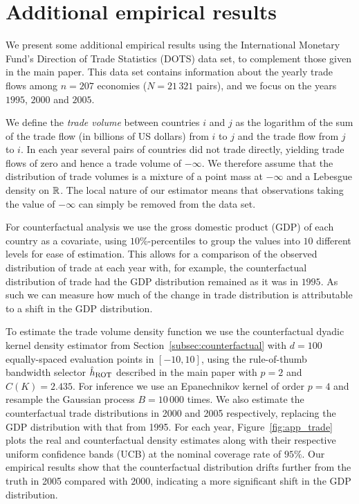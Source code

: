 \section{Additional empirical results}%

We present some additional empirical results
using the International Monetary Fund's
Direction of Trade Statistics (DOTS) data set,
to complement those given in the main paper.
This data set contains information about
the yearly trade flows among
$n = 207$ economies ($N = 21\,321$ pairs),
and we focus on the years
$1995$, $2000$ and $2005$.

We define the \emph{trade volume} between countries
$i$ and $j$ as the logarithm of the sum of
the trade flow (in billions of US dollars)
from $i$ to $j$ and the trade flow from $j$ to $i$.
In each year several pairs of countries
did not trade directly, yielding trade flows of zero
and hence a trade volume of $-\infty$.
We therefore assume that the distribution of trade volumes
is a mixture of a point mass at $-\infty$ and a
Lebesgue density on $\mathbb{R}$.
The local nature of our estimator means that
observations taking the value of $-\infty$
can simply be removed from the data set.

For counterfactual analysis we use the
gross domestic product (GDP) of each country as a
covariate, using $10\%$-percentiles to group the values into
$10$ different levels for ease of estimation.
This allows for a comparison of the observed distribution of trade at each year
with, for example, the counterfactual distribution of trade
had the GDP distribution remained as it was in $1995$.
As such we can measure how much of the change in trade
distribution is attributable
to a shift in the GDP distribution.

To estimate the trade volume density function
we use the counterfactual dyadic kernel density estimator
from Section~\ref{subsec:counterfactual}
with $d=100$ equally-spaced evaluation points in $[-10,10]$,
using the rule-of-thumb bandwidth selector $\hat h_{\operatorname{ROT}}$
described in the main paper with $p=2$ and $C(K) = 2.435$.
For inference we use an
Epanechnikov kernel of order $p=4$ and
resample the Gaussian process
$B = 10\,000$ times.
We also estimate the counterfactual trade distributions
in 2000 and 2005 respectively,
replacing the GDP distribution with that from 1995.
For each year, Figure~\ref{fig:app_trade}
plots the real and counterfactual density estimates
along with their respective uniform confidence bands (UCB)
at the nominal coverage rate of $95\%$.
Our empirical results show that
the counterfactual distribution drifts further from the truth
in 2005 compared with 2000, indicating a more significant shift
in the GDP distribution.

